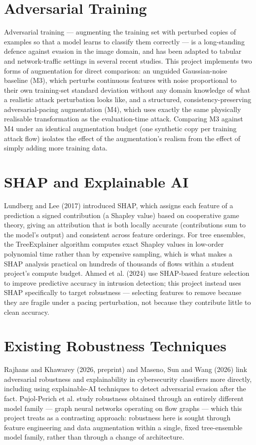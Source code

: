 \documentclass[12pt,a4paper]{report}
\begin{document}
\section{Adversarial Training}
Adversarial training --- augmenting the training set with perturbed copies of examples so that a model learns to classify them correctly --- is a long-standing defence against evasion in the image domain, and has been adapted to tabular and network-traffic settings in several recent studies. This project implements two forms of augmentation for direct comparison: an unguided Gaussian-noise baseline (M3), which perturbs continuous features with noise proportional to their own training-set standard deviation without any domain knowledge of what a realistic attack perturbation looks like, and a structured, consistency-preserving adversarial-pacing augmentation (M4), which uses exactly the same physically realisable transformation as the evaluation-time attack. Comparing M3 against M4 under an identical augmentation budget (one synthetic copy per training attack flow) isolates the effect of the augmentation's realism from the effect of simply adding more training data.

\section{SHAP and Explainable AI}
Lundberg and Lee (2017) introduced SHAP, which assigns each feature of a prediction a signed contribution (a Shapley value) based on cooperative game theory, giving an attribution that is both locally accurate (contributions sum to the model's output) and consistent across feature orderings. For tree ensembles, the TreeExplainer algorithm computes exact Shapley values in low-order polynomial time rather than by expensive sampling, which is what makes a SHAP analysis practical on hundreds of thousands of flows within a student project's compute budget. Ahmed et al. (2024) use SHAP-based feature selection to improve predictive accuracy in intrusion detection; this project instead uses SHAP specifically to target robustness --- selecting features to remove because they are fragile under a pacing perturbation, not because they contribute little to clean accuracy.

\section{Existing Robustness Techniques}
Rajhans and Khawarey (2026, preprint) and Maseno, Sun and Wang (2026) link adversarial robustness and explainability in cybersecurity classifiers more directly, including using explainable-AI techniques to detect adversarial evasion after the fact. Pujol-Perich et al. study robustness obtained through an entirely different model family --- graph neural networks operating on flow graphs --- which this project treats as a contrasting approach: robustness here is sought through feature engineering and data augmentation within a single, fixed tree-ensemble model family, rather than through a change of architecture.
\end{document}

